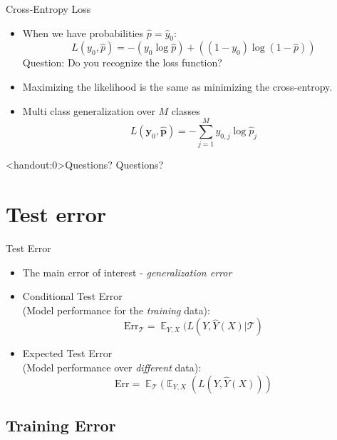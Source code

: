 \documentclass[10pt,handout]{beamer}
\DeclareMathOperator{\E}{\mathbb{E}}
\begin{document}
\begin{frame}{Cross-Entropy Loss}

\begin{itemize}
\item When we have probabilities $\hat{p}=\hat{y}_0$:
\[
L(y_0, \hat{p}) = - (y_0 \log{\hat{p}}) + ((1 - y_0) \log{(1- \hat{p})})
\]
Question: Do you recognize the loss function?
\pause
\item Maximizing the likelihood is the same as minimizing the cross-entropy. \pause
\item Multi class generalization over $M$ classes
\[
L(\mathbf{y}_0, \hat{\mathbf{p}}) = - \sum^M_{j=1} y_{0,j} \log{\hat{p}_j}
\]
\end{itemize}

\end{frame}


\begin{frame}<handout:0>{Questions?}
Questions?
\end{frame}



\section{Test error}
\frame{\sectionpage}

\begin{frame}{Test Error}

\begin{itemize}
\item The main error of interest - \emph{generalization error}
\item Conditional Test Error \\(Model performance for the \emph{training} data):
\[
\text{Err}_\mathcal{T} = \E_{Y,X}(L(Y,\hat{Y}(X) | \mathcal{T})
\]
\item Expected Test Error \\(Model performance over \emph{different} data):
\[
\text{Err} = \E_\mathcal{T}(\E_{Y,X}(L(Y,\hat{Y}(X)))
\]

\end{itemize}

\end{frame}


\subsection{Training Error}
\end{document}
